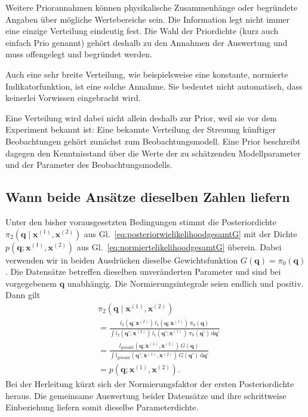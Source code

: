Weitere Priorannahmen können physikalische Zusammenhänge oder begründete
Angaben über mögliche Wertebereiche sein. Die Information legt nicht
immer eine einzige Verteilung eindeutig fest. Die Wahl der Priordichte 
(kurz auch einfach Prio genannt) gehört deshalb zu den Annahmen der Auswertung 
und muss offengelegt und begründet werden. 

Auch eine sehr breite Verteilung, wie beispielsweise eine konstante, normierte
Indikatorfunktion, ist eine solche Annahme. Sie
bedeutet nicht automatisch, dass keinerlei Vorwissen eingebracht wird.

Eine Verteilung wird dabei nicht allein deshalb zur Prior, weil sie vor
dem Experiment bekannt ist: Eine bekannte Verteilung der Streuung
künftiger Beobachtungen gehört zunächst zum Beobachtungsmodell.
Eine Prior beschreibt dagegen den Kenntnisstand über die Werte der
zu schätzenden Modellparameter und der Parameter des Beobachtungsmodells.

\subsection{Wann beide Ansätze dieselben Zahlen liefern}
\label{V4GleicheZahlen}

Unter den bisher vorausgesetzten Bedingungen stimmt die
Posteriordichte
$\pi_2(\mathbf q\mid\mathbf x^{(1)},\mathbf x^{(2)})$
aus Gl.~\eqref{eq:posteriorwielikelihoodgesamtG}
mit der Dichte
$p(\mathbf q;\mathbf x^{(1)},\mathbf x^{(2)})$
aus Gl.~\eqref{eq:normiertelikelihoodgesamtG} überein.
Dabei verwenden wir in beiden Ausdrücken dieselbe
Gewichtsfunktion $G(\mathbf q)=\pi_0(\mathbf q)$.
Die Datensätze betreffen dieselben unveränderten Parameter
und sind bei vorgegebenem $\mathbf q$ unabhängig.
Die Normierungsintegrale seien endlich und positiv.
Dann gilt
\begin{equation}
\begin{aligned}
&\pi_2(\mathbf q\mid\mathbf x^{(1)},\mathbf x^{(2)})
\\[1mm]
&=
\frac{
l_2(\mathbf q;\mathbf x^{(2)})
\,l_1(\mathbf q;\mathbf x^{(1)})\,\pi_0(\mathbf q)
}{
\displaystyle\int
l_2(\mathbf q';\mathbf x^{(2)})
\,l_1(\mathbf q';\mathbf x^{(1)})\,\pi_0(\mathbf q')
\,\mathrm d\mathbf q'
}
\\[2mm]
&=
\frac{
l_{\mathrm{gesamt}}(\mathbf q;\mathbf x^{(1)},\mathbf x^{(2)})
\,G(\mathbf q)
}{
\displaystyle\int
l_{\mathrm{gesamt}}(\mathbf q';\mathbf x^{(1)},\mathbf x^{(2)})
\,G(\mathbf q')\,\mathrm d\mathbf q'
}
\\[2mm]
&=p(\mathbf q;\mathbf x^{(1)},\mathbf x^{(2)}).
\end{aligned}
\end{equation}
Bei der Herleitung kürzt sich der Normierungsfaktor
der ersten Posteriordichte heraus.
Die gemeinsame Auswertung beider Datensätze und ihre
schrittweise Einbeziehung liefern somit dieselbe
Parameterdichte.

